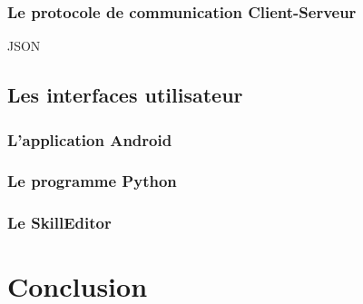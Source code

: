 \documentclass[a4paper,10pt]{report}
\begin{document}
      \subsection{Le protocole de communication Client-Serveur}
      JSON

      \section{Les interfaces utilisateur}

      \subsection{L'application Android}

      \subsection{Le programme Python}

      \subsection{Le SkillEditor}

    \chapter{Conclusion}
\end{document}
